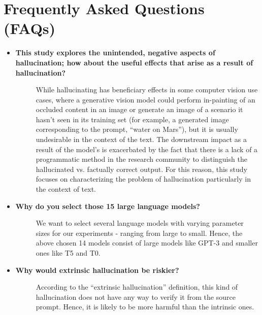 \newpage
\onecolumn
\section*{Frequently Asked Questions (FAQs)}\label{sec:FAQs}

\begin{itemize}
[leftmargin=2mm]
\setlength\itemsep{0em}
    \item[\ding{93}] { \selectfont \textbf{This study explores the unintended, negative aspects of hallucination; how about the useful effects that arise as a result of hallucination?}}
    \vspace{-2mm}
    \begin{description}
    \item[] While hallucinating has beneficiary effects in some computer vision use cases, where a generative vision model could perform in-painting of an occluded content in an image or generate an image of a scenario it hasn't seen in its training set (for example, a generated image corresponding to the prompt, ``water on Mars''), but it is usually undesirable in the context of the text. The downstream impact as a result of the model's is exacerbated by the fact that there is a lack of a programmatic method in the research community to distinguish the hallucinated vs. factually correct output. For this reason, this study focuses on characterizing the problem of hallucination particularly in the context of text.
    \end{description}

    \item[\ding{93}] { \selectfont \textbf{Why do you select those 15 large language models?}}
    \vspace{-2mm}
    \begin{description}
    \item[] We want to select several language models with varying parameter sizes for our experiments - ranging from large to small. Hence, the above chosen 14 models consist of large models like GPT-3 and smaller ones like T5 and T0.
    \end{description}

    \item[\ding{93}] { \selectfont \textbf{Why would extrinsic hallucination be riskier?}}
    \vspace{-2mm}
    \begin{description}
    \item[] According to the ``extrinsic hallucination'' definition, this kind of hallucination does not have any way to verify it from the source prompt. Hence, it is likely to be more harmful than the intrinsic ones.
    \end{description}


\end{itemize}
